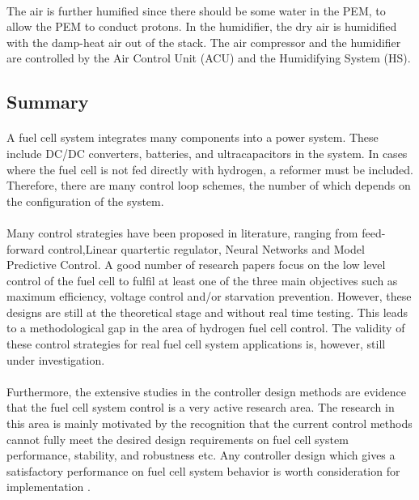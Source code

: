 \paragraph{}The air is further humified since there should be some water in the PEM, to allow the PEM to conduct protons. In the humidifier, the dry air is humidified with the damp-heat air out of the stack. The air compressor and the humidifier are controlled by the Air Control Unit (ACU) and the Humidifying System (HS).
\subsection{Summary}
\paragraph{}A fuel cell system integrates many components into a power system. These include DC/DC converters, batteries, and ultracapacitors in the system. In cases where the fuel cell is not fed directly with hydrogen, a reformer must be included. Therefore, there are many control loop schemes, the number of which depends on the configuration of the system. 
\paragraph{}Many control strategies have been proposed in literature, ranging from feed-forward control,Linear quartertic regulator, Neural Networks and Model Predictive Control. A good number of research papers focus on the low level control of the fuel cell to fulfil at least one of the three main objectives such as maximum efficiency, voltage control and/or starvation prevention. However, these designs are still at the theoretical stage and without real time testing. This leads to a methodological gap in the area of hydrogen fuel cell control. The validity of these control strategies for real fuel cell system applications is, however, still under investigation. 
\paragraph{}Furthermore, the extensive studies in the controller design methods are evidence that the fuel cell system control is a very active research area. The research in this area is mainly motivated by the recognition that the current control methods cannot fully meet the desired design requirements on fuel cell system performance, stability, and robustness etc. Any controller design which gives a satisfactory performance on fuel cell system behavior is worth consideration for implementation \cite{ehsani_modern_2018}.

